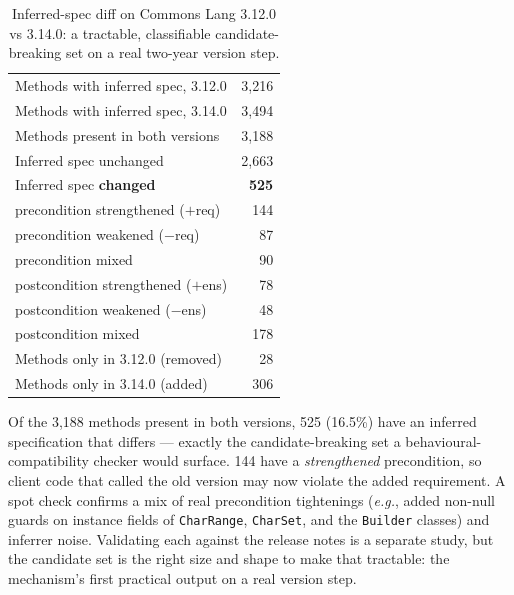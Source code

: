 \begin{table}[ht]
\centering
\small
\caption{Inferred-spec diff on Commons Lang 3.12.0 vs 3.14.0: a tractable, classifiable candidate-breaking set on a real two-year version step.}
\label{tab:version-diff}
\begin{tabular}{lr}
\toprule
Methods with inferred spec, 3.12.0     & 3{,}216 \\
Methods with inferred spec, 3.14.0     & 3{,}494 \\
Methods present in both versions       & 3{,}188 \\
\midrule
Inferred spec unchanged                & 2{,}663 \\
Inferred spec \textbf{changed}         & \textbf{525} \\
\hspace{1em} precondition strengthened ($+$req)        & 144 \\
\hspace{1em} precondition weakened ($-$req)            & 87 \\
\hspace{1em} precondition mixed                        & 90 \\
\hspace{1em} postcondition strengthened ($+$ens)       & 78 \\
\hspace{1em} postcondition weakened ($-$ens)           & 48 \\
\hspace{1em} postcondition mixed                       & 178 \\
\midrule
Methods only in 3.12.0 (removed)       & 28 \\
Methods only in 3.14.0 (added)         & 306 \\
\bottomrule
\end{tabular}
\end{table}

Of the 3{,}188 methods present in both versions, 525 (16.5\%) have an
inferred specification that differs --- exactly the candidate-breaking set a
behavioural-compatibility checker would surface. 144 have a \emph{strengthened}
precondition, so client code that called the old version may now violate the
added requirement. A spot check confirms a mix of real precondition tightenings
(\textit{e.g.}, added non-null guards on instance fields of
\texttt{CharRange}, \texttt{CharSet}, and the \texttt{Builder}
classes) and inferrer noise. Validating each against the release notes is a
separate study, but the candidate set is the right size and shape to make that
tractable: the mechanism's first practical output on a real version step.

